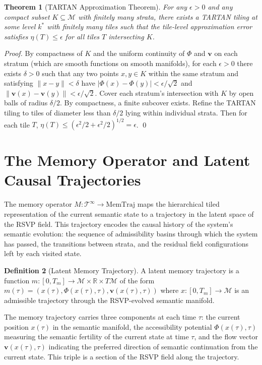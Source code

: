 \documentclass[12pt, a4paper, openany]{book}
\theoremstyle{plain}
\newtheorem{theorem}{Theorem}[chapter]
\theoremstyle{definition}
\newtheorem{definition}[theorem]{Definition}
\theoremstyle{remark}
\newcommand{\vvec}{\mathbf{v}}
\begin{document}
\begin{theorem}[TARTAN Approximation Theorem]
For any $\epsilon > 0$ and any compact subset $K \subseteq \mathcal{M}$ with finitely many strata, there exists a TARTAN tiling at some level $k^*$ with finitely many tiles such that the tile-level approximation error satisfies $\eta(T) \leq \epsilon$ for all tiles $T$ intersecting $K$.
\end{theorem}

\begin{proof}
By compactness of $K$ and the uniform continuity of $\Phi$ and $\vvec$ on each stratum (which are smooth functions on smooth manifolds), for each $\epsilon > 0$ there exists $\delta > 0$ such that any two points $x, y \in K$ within the same stratum and satisfying $\|x - y\| < \delta$ have $|\Phi(x) - \Phi(y)| < \epsilon/\sqrt{2}$ and $\|\vvec(x) - \vvec(y)\| < \epsilon/\sqrt{2}$. Cover each stratum's intersection with $K$ by open balls of radius $\delta/2$. By compactness, a finite subcover exists. Refine the TARTAN tiling to tiles of diameter less than $\delta/2$ lying within individual strata. Then for each tile $T$, $\eta(T) \leq (\epsilon^2/2 + \epsilon^2/2)^{1/2} = \epsilon$. \qed
\end{proof}

\section{The Memory Operator and Latent Causal Trajectories}

The memory operator $M: \mathcal{T}^\infty \to \mathrm{MemTraj}$ maps the hierarchical tiled representation of the current semantic state to a trajectory in the latent space of the RSVP field. This trajectory encodes the causal history of the system's semantic evolution: the sequence of admissibility basins through which the system has passed, the transitions between strata, and the residual field configurations left by each visited state.

\begin{definition}[Latent Memory Trajectory]
A latent memory trajectory is a function $m: [0, T_m] \to \mathcal{M} \times \mathbb{R} \times T\mathcal{M}$ of the form $m(\tau) = (x(\tau), \Phi(x(\tau), \tau), \vvec(x(\tau), \tau))$ where $x: [0, T_m] \to \mathcal{M}$ is an admissible trajectory through the RSVP-evolved semantic manifold.
\end{definition}

The memory trajectory carries three components at each time $\tau$: the current position $x(\tau)$ in the semantic manifold, the accessibility potential $\Phi(x(\tau), \tau)$ measuring the semantic fertility of the current state at time $\tau$, and the flow vector $\vvec(x(\tau), \tau)$ indicating the preferred direction of semantic continuation from the current state. This triple is a section of the RSVP field along the trajectory.
\end{document}
